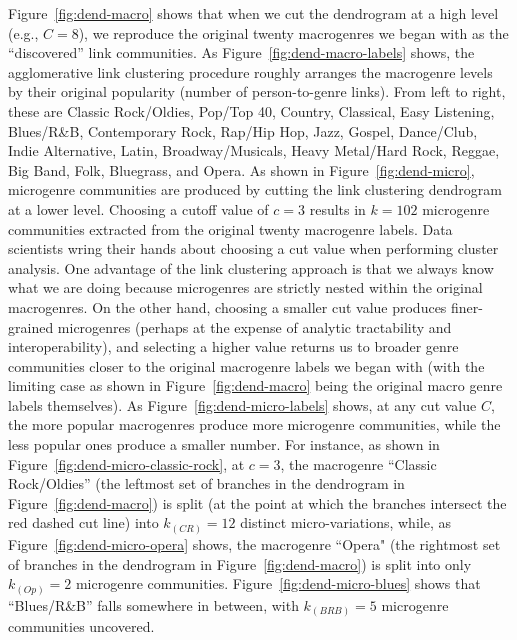 \documentclass[a4paper,12pt]{extarticle}
\begin{document}
Figure~\ref{fig:dend-macro} shows that when we cut the dendrogram at a high level (e.g., $C = 8$), we reproduce the original twenty macrogenres we began with as the ``discovered'' link communities. As Figure~\ref{fig:dend-macro-labels} shows, the agglomerative link clustering procedure roughly arranges the macrogenre levels by their original popularity (number of person-to-genre links). From left to right, these are Classic Rock/Oldies, Pop/Top 40, Country, Classical, Easy Listening, Blues/R\&B, Contemporary Rock, Rap/Hip Hop, Jazz, Gospel, Dance/Club, Indie Alternative, Latin, Broadway/Musicals, Heavy Metal/Hard Rock, Reggae, Big Band, Folk, Bluegrass, and Opera. As shown in Figure~\ref{fig:dend-micro}, microgenre communities are produced by cutting the link clustering dendrogram at a lower level. Choosing a cutoff value of $c = 3$ results in $k = 102$ microgenre communities extracted from the original twenty macrogenre labels. Data scientists wring their hands about choosing a cut value when performing cluster analysis. One advantage of the link clustering approach is that we always know what we are doing because microgenres are strictly nested within the original macrogenres. On the other hand, choosing a smaller cut value produces finer-grained microgenres (perhaps at the expense of analytic tractability and interoperability), and selecting a higher value returns us to broader genre communities closer to the original macrogenre labels we began with (with the limiting case as shown in Figure~\ref{fig:dend-macro} being the original macro genre labels themselves). As Figure~\ref{fig:dend-micro-labels} shows, at any cut value $C$, the more popular macrogenres produce more microgenre communities, while the less popular ones produce a smaller number. For instance, as shown in Figure~\ref{fig:dend-micro-classic-rock}, at $c = 3$, the macrogenre ``Classic Rock/Oldies'' (the leftmost set of branches in the dendrogram in Figure~\ref{fig:dend-macro}) is split (at the point at which the branches intersect the red dashed cut line) into $k_{(CR)} = 12$ distinct micro-variations, while, as Figure~\ref{fig:dend-micro-opera} shows, the macrogenre ``Opera" (the rightmost set of branches in the dendrogram in Figure~\ref{fig:dend-macro}) is split into only $k_{(Op)} = 2$  microgenre communities. Figure~\ref{fig:dend-micro-blues} shows that ``Blues/R\&B'' falls somewhere in between, with $k_{(BRB)} = 5$  microgenre communities uncovered.
\end{document}

